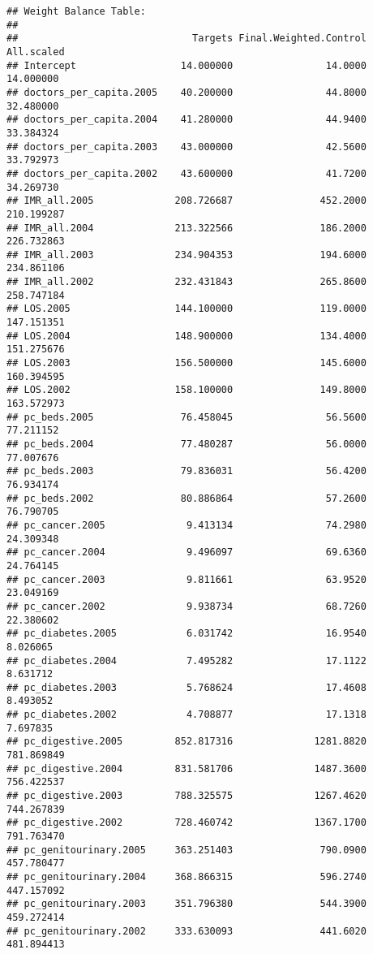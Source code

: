 \documentclass[
]{article}
\begin{document}
\begin{verbatim}
## Weight Balance Table: 
## 
##                              Targets Final.Weighted.Control   All.scaled
## Intercept                  14.000000                14.0000    14.000000
## doctors_per_capita.2005    40.200000                44.8000    32.480000
## doctors_per_capita.2004    41.280000                44.9400    33.384324
## doctors_per_capita.2003    43.000000                42.5600    33.792973
## doctors_per_capita.2002    43.600000                41.7200    34.269730
## IMR_all.2005              208.726687               452.2000   210.199287
## IMR_all.2004              213.322566               186.2000   226.732863
## IMR_all.2003              234.904353               194.6000   234.861106
## IMR_all.2002              232.431843               265.8600   258.747184
## LOS.2005                  144.100000               119.0000   147.151351
## LOS.2004                  148.900000               134.4000   151.275676
## LOS.2003                  156.500000               145.6000   160.394595
## LOS.2002                  158.100000               149.8000   163.572973
## pc_beds.2005               76.458045                56.5600    77.211152
## pc_beds.2004               77.480287                56.0000    77.007676
## pc_beds.2003               79.836031                56.4200    76.934174
## pc_beds.2002               80.886864                57.2600    76.790705
## pc_cancer.2005              9.413134                74.2980    24.309348
## pc_cancer.2004              9.496097                69.6360    24.764145
## pc_cancer.2003              9.811661                63.9520    23.049169
## pc_cancer.2002              9.938734                68.7260    22.380602
## pc_diabetes.2005            6.031742                16.9540     8.026065
## pc_diabetes.2004            7.495282                17.1122     8.631712
## pc_diabetes.2003            5.768624                17.4608     8.493052
## pc_diabetes.2002            4.708877                17.1318     7.697835
## pc_digestive.2005         852.817316              1281.8820   781.869849
## pc_digestive.2004         831.581706              1487.3600   756.422537
## pc_digestive.2003         788.325575              1267.4620   744.267839
## pc_digestive.2002         728.460742              1367.1700   791.763470
## pc_genitourinary.2005     363.251403               790.0900   457.780477
## pc_genitourinary.2004     368.866315               596.2740   447.157092
## pc_genitourinary.2003     351.796380               544.3900   459.272414
## pc_genitourinary.2002     333.630093               441.6020   481.894413

\end{verbatim}
\end{document}
